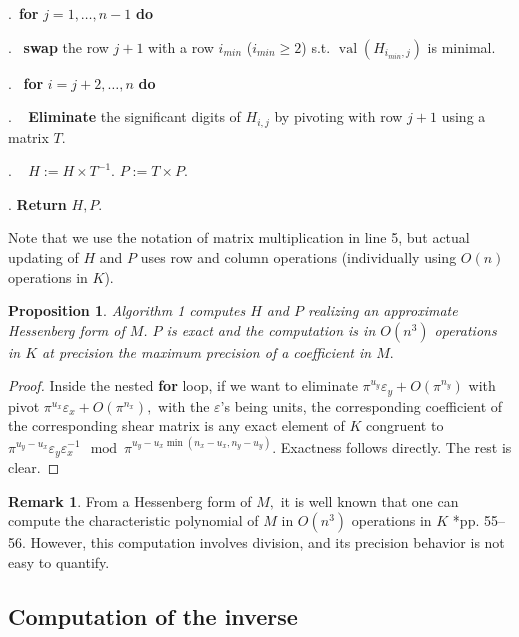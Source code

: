 \documentclass[sigconf]{acmart}
\DeclareMathOperator{\val}{val}
\newtheorem{prop}[theo]{Proposition}
\theoremstyle{definition}
\newtheorem{rem}[theo]{Remark}
\begin{document}
.\ {\bf for} $j=1,\dots,n-1$ {\bf do} 

.\  \:  {\bf swap} the row $j+1$ with a row $i_{min}$ ($i_{min} \geq 2$) s.t. $\val(H_{i_{min},j})$ is minimal. 

.\  \:  {\bf for} $i=j+2,\dots,n$ {\bf do} 

. \ \: \:  \textbf{Eliminate} the significant digits of $H_{i,j}$ by pivoting with row $j+1$ 
using a matrix $T.$

. \ \: \:  $H:=H \times T^{-1}.$ \: $P:=T \times P.$

. \textbf{Return} $H,P.$

\vspace{-1ex}\noindent\hrulefill

\medskip

Note that we use the notation of matrix multiplication in line 5, but actual updating of
$H$ and $P$ uses row and column operations (individually using $O(n)$ operations in $K$).

\begin{prop} 
Algorithm 1 computes $H$ and $P$ realizing an approximate Hessenberg form of $M$.
$P$ is exact  
and the computation is in $O(n^3)$ operations in $K$ at precision the maximum precision of a coefficient in $M.$
\end{prop}
\begin{proof}
Inside the nested \textbf{for} loop, if we want to eliminate $\pi^{u_y} \varepsilon_y+O(\pi^{n_y})$ with pivot $\pi^{u_x} \varepsilon_x+O(\pi^{n_x}),$
with the $\varepsilon$'s being units,
the corresponding coefficient of the corresponding shear matrix is 
any exact element of $K$ congruent to 
$\pi^{u_y-u_x} \varepsilon_y \varepsilon_x^{-1} \mod \pi^{u_y-u_x\min (n_x-u_x,n_y-u_y)}$.
Exactness follows directly. 
The rest is clear.
\end{proof}

\begin{rem} \label{rem:char_pol_from_hessenberg}
From a Hessenberg form of $M,$ it is well known
that one can compute the characteristic polynomial of 
$M$ in $O(n^3)$ operations in $K$ \cite{Cohen:2013}*{pp. 55--56}.
However, this computation involves division, and its
precision behavior is not easy to quantify.
\end{rem}


\subsection{Computation of the inverse}
\end{document}
